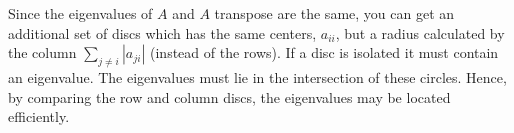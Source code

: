 \documentclass[12pt]{article}
\begin{document}
Since the eigenvalues of $A$ and $A$ transpose are the same, you can get an additional set of discs which has the same centers, $a_{ii}$, but a radius calculated by the column $\sum_{j\neq i}|a_{ji}|$ (instead of the rows). If  a disc is isolated it must contain an eigenvalue. The eigenvalues must lie in the intersection of these circles. Hence, by comparing the row and column discs, the eigenvalues may be located efficiently.
\end{document}
